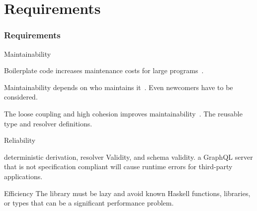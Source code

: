 \section{Requirements}

\begin{frame}[allowframebreaks]\frametitle{Requirements}  

\begin{block}{Maintainability}



\begin{itemize}

     Boilerplate code increases maintenance costs for large programs~\cite{scrap-your-boilerplate}.

     Maintainability depends on who maintains it~\cite{contr-reduce-maintainability}. Even newcomers have to be considered.

     The loose coupling and high cohesion improves maintainability~\cite{arc-modularity}. The reusable type and resolver definitions. 
    
\end{itemize}
\end{block}

\begin{block}{Reliability}

\begin{itemize}
     deterministic derivation, resolver Validity, and schema validity.
     a GraphQL server that is not specification compliant will cause runtime errors for third-party applications.
\end{itemize}

\end{block}

\begin{block}{Efficiency}
The library must be lazy and avoid known Haskell functions, libraries, or types that can be a significant performance problem.
\end{block}

\end{frame}